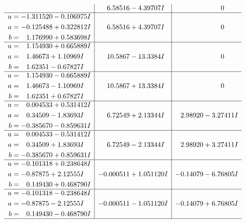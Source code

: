 \documentclass[1p]{elsarticle_modified}
\theoremstyle{definition}
\begin{document}
$$\begin{array}{c|c|c}
 & \phantom{-}6.58516 - 4.39707 I & \phantom{-0.000000 } 0 \\ \hline\begin{aligned}
u &= -1.311520 - 0.106975 I \\
a &= -0.125488 + 0.322812 I \\
b &= \phantom{-}1.176990 + 0.583698 I\end{aligned}
 & \phantom{-}6.58516 + 4.39707 I & \phantom{-0.000000 } 0 \\ \hline\begin{aligned}
u &= \phantom{-}1.154930 + 0.665889 I \\
a &= \phantom{-}1.46673 + 1.10969 I \\
b &= \phantom{-}1.62351 - 0.67827 I\end{aligned}
 & \phantom{-}10.5867 - 13.3384 I & \phantom{-0.000000 } 0 \\ \hline\begin{aligned}
u &= \phantom{-}1.154930 - 0.665889 I \\
a &= \phantom{-}1.46673 - 1.10969 I \\
b &= \phantom{-}1.62351 + 0.67827 I\end{aligned}
 & \phantom{-}10.5867 + 13.3384 I & \phantom{-0.000000 } 0 \\ \hline\begin{aligned}
u &= \phantom{-}0.004533 + 0.531412 I \\
a &= \phantom{-}0.34509 - 1.83693 I \\
b &= -0.385670 - 0.859631 I\end{aligned}
 & \phantom{-}6.72549 + 2.13344 I & \phantom{-}2.98920 - 3.27411 I \\ \hline\begin{aligned}
u &= \phantom{-}0.004533 - 0.531412 I \\
a &= \phantom{-}0.34509 + 1.83693 I \\
b &= -0.385670 + 0.859631 I\end{aligned}
 & \phantom{-}6.72549 - 2.13344 I & \phantom{-}2.98920 + 3.27411 I \\ \hline\begin{aligned}
u &= -0.101318 + 0.238648 I \\
a &= -0.87875 + 2.12555 I \\
b &= \phantom{-}0.149430 + 0.468790 I\end{aligned}
 & -0.000511 + 1.051120 I & -0.14079 - 6.76805 I \\ \hline\begin{aligned}
u &= -0.101318 - 0.238648 I \\
a &= -0.87875 - 2.12555 I \\
b &= \phantom{-}0.149430 - 0.468790 I\end{aligned}
 & -0.000511 - 1.051120 I & -0.14079 + 6.76805 I\\
 \hline 
 \end{array}$$\newpage\newpage\renewcommand{\arraystretch}{1}
\end{document}
